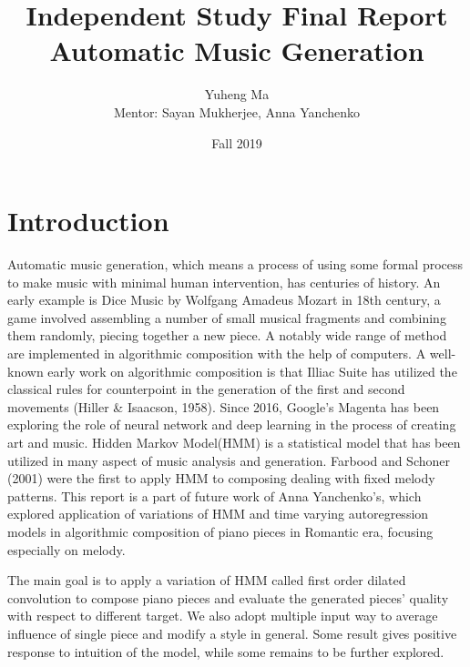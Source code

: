 \documentclass[10pt, oneside]{article}
\title{
Independent Study Final Report\\
\Large Automatic Music Generation \\
}
\author{Yuheng Ma\\[0.3cm]{ Mentor: Sayan Mukherjee, Anna Yanchenko}}
\date{Fall 2019}
\begin{document}
\maketitle

\vspace{.25in}

\section{Introduction}
Automatic music generation, which means a process of using some formal process to make music with minimal human intervention\cite{briefhistoryofac}, has centuries of history. An early example is Dice Music by Wolfgang Amadeus Mozart\cite{algorithmiccomposition} in 18th century, a game involved assembling a number of small musical fragments and combining them randomly, piecing together a new piece. A notably wide range of method are implemented in algorithmic composition with the help of computers. A well-known early work on algorithmic composition is that Illiac Suite has utilized the classical rules for counterpoint in the generation of the first and second movements (Hiller \& Isaacson, 1958)\cite{AImethodsinalgorithmicomposing}. Since 2016, Google's Magenta\cite{magenta} has been exploring the role of neural network and deep learning  in the process of creating art and music. Hidden Markov Model(HMM) is a statistical model that has been utilized in many aspect of music analysis and generation. Farbood and Schoner (2001) \cite{farbood2001analysis} were the first to apply HMM to composing dealing with fixed melody patterns. This report is a part of future work of Anna Yanchenko's\cite{yanchenko2017classical}, which explored application of variations of HMM and time varying autoregression models in algorithmic composition of piano pieces in Romantic era, focusing especially on melody.

The main goal is to apply a variation of HMM called first order dilated convolution to compose piano pieces and evaluate the generated pieces' quality with respect to different target. We also adopt multiple input way to average influence of single piece and modify a style in general. Some result gives positive response to intuition of the model, while some remains to be further explored.
\end{document}
